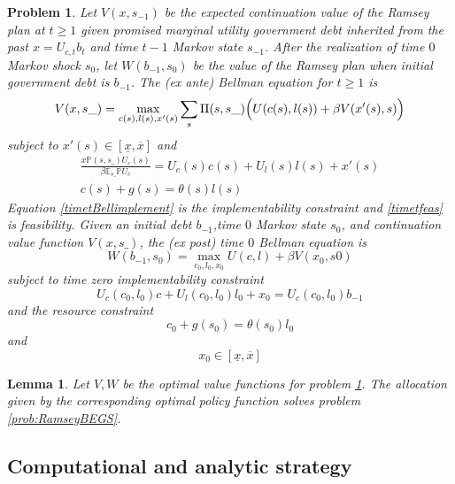 \documentclass[12pt]{article}
\newcommand{\tjs}[1]{\textcolor{red}{$^{\textrm{tjs}}${#1}}}
\newcommand{\EE}{\mathbb E}
\newtheorem{lemma}[theorem]{Lemma}
\newtheorem{problem}[theorem]{Problem}
\begin{document}
\begin{problem}\label{prob:RamseyBellman}
Let   $V(x, s_{-1})$ be the {\em expected} continuation value of the Ramsey plan at $t \geq 1$  given promised marginal utility government debt inherited
from the past $x = U_{c,t} b_t $ and time $t-1$ Markov state $s_{-1}$.
After the realization of time $0$ Markov shock $s_0$, let $W(b_{-1},s_0)$ be the value of the Ramsey plan when initial
government debt is $b_{-1}$. %
The (\textit{ex ante}) Bellman equation for $t\geq1$  is
	\begin{equation}\label{eqn:Bellman1}
		V(x,s\_) = \max_{c(s),l(s),x'(s)} \sum_s \Pi(s,s\_)\Bigl(U(c(s),l(s)) + \beta V(x'(s),s)\Bigr)
	\end{equation}
subject to $x'(s)\in [\underline x,\overline x]$ and
	\begin{align}
		\frac{x \mathbb{P}(s,s\_) U_c(s)}{\beta\EE_{s\_} \mathbb{P}U_c} =U_c(s)c(s)+U_l(s)l(s) + x'(s) \label{timetBellimplement}\\
		c(s) + g(s) = \theta(s)l(s) \label{timetfeas}
	\end{align}
Equation \eqref{timetBellimplement} is the implementability constraint and \eqref{timetfeas} is feasibility.
	Given an initial  debt $b_{-1}$,time $0$ Markov state $s_0$,  and continuation value function $V(x,s\_)$, the (\textit{ex post}) time $0$ Bellman equation is
	\begin{equation}\label{eqn:Bellman0}
		W(b_{-1},s_0) = \max_{c_{0},l_0,x_{0}} U(c,l) +\beta V(x_0,s0)
	\end{equation} subject to  time zero implementability constraint
	\[
		U_{c}(c_0,l_0)c + U_l(c_0,l_0) l_0 + x_0 = U_c(c_0,l_0) b_{-1}
	\]and  the resource constraint
	\[
		c_0+ g(s_0) = \theta(s_0) l_0
	\]and
	\[
		x_0 \in [\underline x,\overline x]
	\]
\end{problem}
\begin{lemma}  Let $V, W$ be the optimal value functions for  problem \ref{prob:RamseyBellman}.  The allocation given by the  corresponding optimal policy function solves problem \ref{prob:RamseyBEGS}.
\end{lemma}

\subsection{Computational and analytic strategy}
\end{document}

